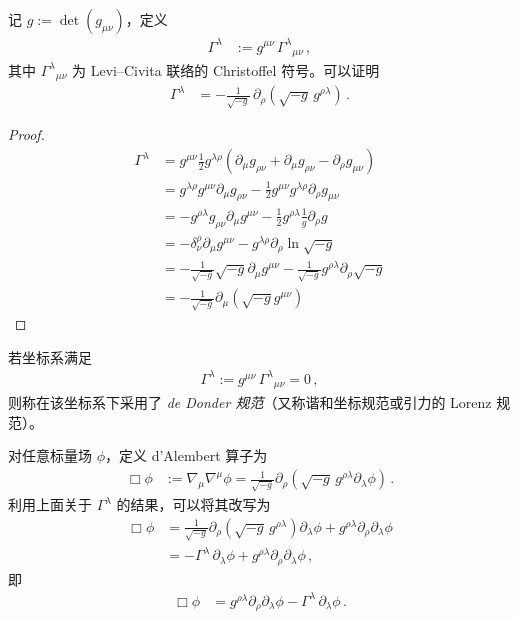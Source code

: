 记 $g := \det(g_{\mu\nu})$，定义
\begin{align}
\Gamma^{\lambda} &:= g^{\mu\nu}\,\Gamma^{\lambda}{}_{\mu\nu}\,,
\end{align}
其中 $\Gamma^{\lambda}{}_{\mu\nu}$ 为 Levi--Civita 联络的 Christoffel 符号。可以证明
\begin{align}
\Gamma^{\lambda}
&=
-\frac{1}{\sqrt{-g}}\,
\partial_{\rho}
\left(
  \sqrt{-g}\,g^{\rho\lambda}
\right)\,.
\end{align}
\begin{proof}
\begin{align}
\Gamma^{\lambda} &= g^{\mu\nu} \frac{1}{2} g^{\lambda\rho} \left( \partial_{\mu} g_{\rho\nu} + \partial_{\mu} g_{\rho\nu} - \partial_{\rho} g_{\mu\nu} \right) \\
&= g^{\lambda\rho} g^{\mu\nu} \partial_{\mu} g_{\rho\nu} - \frac{1}{2} g^{\mu\nu} g^{\lambda\rho} \partial_{\rho} g_{\mu\nu} \\
&= - g^{\rho\lambda} g_{\rho\nu} \partial_{\mu} g^{\mu\nu} - \frac{1}{2} g^{\rho\lambda} \frac{1}{g} \partial_{\rho} g \\
&= - \delta^{\rho}_{\nu} \partial_{\mu} g^{\mu\nu} - g^{\lambda\rho} \partial_{\rho} \ln \sqrt{-g} \\
&= - \frac{1}{\sqrt{-g}} \sqrt{-g} \partial_{\mu} g^{\mu\nu} - \frac{1}{\sqrt{-g}} g^{\rho\lambda} \partial_{\rho} \sqrt{-g} \\
&= - \frac{1}{\sqrt{-g}} \partial_{\mu} (\sqrt{-g} g^{\mu\nu})
\end{align}
\end{proof}

\begin{definition}[de Donder 规范]
    若坐标系满足
    \begin{align}
        \Gamma^{\lambda} := g^{\mu\nu}\,\Gamma^{\lambda}{}_{\mu\nu} = 0\,,
    \end{align}
    则称在该坐标系下采用了 \emph{de Donder 规范}（又称谐和坐标规范或引力的 Lorenz 规范）。
\end{definition}

对任意标量场 $\phi$，定义 d'Alembert 算子为
\begin{align}
\Box\phi
&:=
\nabla_{\mu}\nabla^{\mu}\phi
=
\frac{1}{\sqrt{-g}}
\partial_{\rho}
\left(
  \sqrt{-g}\,
  g^{\rho\lambda}
  \partial_{\lambda}\phi
\right)\,.
\end{align}
利用上面关于 $\Gamma^{\lambda}$ 的结果，可以将其改写为
\begin{align}
\Box\phi
&=
\frac{1}{\sqrt{-g}}
\partial_{\rho}
\left(
  \sqrt{-g}\,
  g^{\rho\lambda}
\right)\partial_{\lambda}\phi
+
g^{\rho\lambda}\partial_{\rho}\partial_{\lambda}\phi \\
&=
-\Gamma^{\lambda}\,\partial_{\lambda}\phi
+
g^{\rho\lambda}\partial_{\rho}\partial_{\lambda}\phi\,,
\end{align}
即
\begin{align}
\Box\phi
&=
g^{\rho\lambda}\partial_{\rho}\partial_{\lambda}\phi
-
\Gamma^{\lambda}\,\partial_{\lambda}\phi\,.
\end{align}


